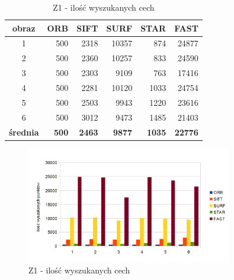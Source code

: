 \begin{table}[htbp]
  \centering
  \caption{Z1 - ilość wyszukanych cech}
    \begin{tabular}{|c|r|r|r|r|r|}\hline
    
    obraz & \textbf{ORB} & \textbf{SIFT} & \textbf{SURF} & \textbf{STAR} & \textbf{FAST} \\\hline
    
   
    1 & 500 & 2318 & 10357 & 874 & 24877 \\
    2 & 500 & 2360 & 10257 & 833 & 24590 \\
    3 & 500 & 2303 & 9109 & 763 & 17416 \\
    4 & 500 & 2281 & 10120 & 1033 & 24754 \\
    5 & 500 & 2503 & 9943 & 1220 & 23616 \\
    6 & 500 & 3012 & 9473 & 1485 & 21403 \\\hline
    \textbf{średnia} & \textbf{500} & \textbf{2463} & \textbf{9877} & \textbf{1035} & \textbf{22776} \\
    \hline
    \end{tabular}%
  \label{tab:z1_f1}%
\end{table}%


\begin{figure}
\centering
\includegraphics[width=0.8\textwidth]{pict/slowik/z1/f1.png}
\caption{Z1 - ilość wyszukanych cech}
\label{fig:z1_f1}
\end{figure}


